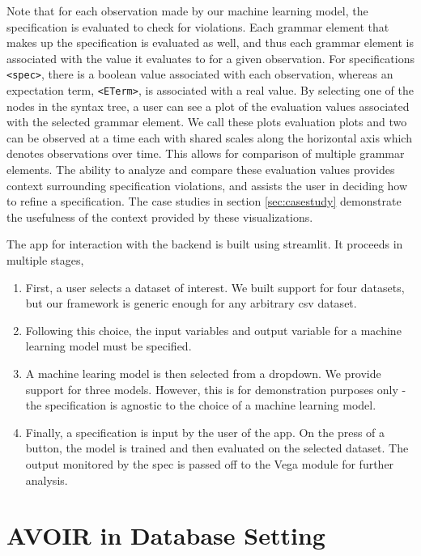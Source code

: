 \begin{subappendices}
Note that for each observation made by our machine learning model, the specification is evaluated to check for violations.
Each grammar element that makes up the specification is evaluated as well, and thus each grammar element is associated with the value it evaluates to for a given observation.
For specifications \texttt{<spec>}, there is a boolean value associated with each observation, whereas an expectation term, \texttt{<ETerm>}, is associated with a real value.
By selecting one of the nodes in the syntax tree, a user can see a plot of the evaluation values associated with the selected grammar element.
We call these plots evaluation plots and two can be observed at a time 
each with shared scales along the horizontal axis which denotes observations over time.
This allows for comparison of multiple grammar elements.
The ability to analyze and compare these evaluation values provides context surrounding specification violations, and assists the user in deciding how to refine a specification.
The case studies in section \ref{sec:casestudy} demonstrate the usefulness of the context provided by these visualizations.

The app for interaction with the backend is built using streamlit. It proceeds in multiple stages,
\begin{enumerate}
    \item First, a user selects a dataset of interest. We built support for four datasets, but our framework is generic enough for any arbitrary csv dataset.
    \item Following this choice, the input variables and output variable for a machine learning model must be specified.
    \item A machine learing model is then selected from a dropdown. We provide support for three models. However, this is for demonstration purposes only - the specification is agnostic to the choice of a machine learning model.
    \item Finally, a specification is input by the user of the app. On the press of a button, the model is trained and then evaluated on the selected dataset. The output monitored by the spec is passed off to the Vega module for further analysis.
\end{enumerate}

\section{AVOIR in Database Setting}


\end{subappendices}
